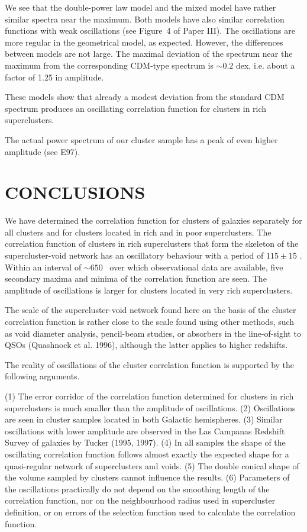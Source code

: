 We see that the double-power law model and the mixed model have rather
similar spectra near the maximum. Both models have also similar
correlation functions with weak oscillations (see Figure~4 of Paper
III).  The oscillations are more regular in the geometrical model, as
expected. However, the differences between models are not large.  The
maximal deviation of the spectrum near the maximum from the
corresponding CDM-type spectrum is  $\sim 0.2$ dex,
i.e. about a factor of 1.25 in amplitude. 

These models show that already a modest deviation from the
standard CDM spectrum  produces an oscillating correlation
function for clusters in rich superclusters.

The actual power spectrum of our cluster sample has a peak of even
higher amplitude (see E97).



\section{  CONCLUSIONS}

We have determined the correlation function for clusters of galaxies
separately for all clusters and for clusters located in rich and in
poor superclusters. The correlation function of clusters in rich
superclusters that form the skeleton of the supercluster-void network
has an oscillatory behaviour with a period of $115
\pm 15$ \Mpc. Within an interval of $\sim650$ \Mpc\ over which 
observational data are available, five secondary maxima and minima of
the correlation function are seen.  The amplitude of oscillations is
larger for clusters located in very rich superclusters.

The scale of the supercluster-void network found here on the basis of the
cluster correlation function is rather close to the scale found using other
methods, such as void diameter analysis, pencil-beam studies, or absorbers in
the line-of-sight to QSOs (Quashnock et al. 1996), although the latter applies
to higher redshifts.

The reality of oscillations of the cluster correlation function
is supported by the following arguments.

(1) The error corridor of the correlation function determined for clusters
in rich superclusters is much smaller
than the amplitude of oscillations.
(2) Oscillations are seen in cluster samples located
in both Galactic hemispheres.  
(3) Similar oscillations with lower amplitude are observed in the
Las Campanas Redshift Survey of galaxies by Tucker \etal (1995, 1997).
(4) In all samples the shape of the oscillating
correlation function  follows almost exactly the expected shape
 for a quasi-regular network of superclusters and voids.
(5) The double conical shape of the volume sampled by 
clusters cannot influence the results. 
(6) Parameters of the oscillations practically do not depend
on the smoothing length of the correlation function, nor on the
neighbourhood radius used in supercluster definition, or on errors of
the selection function used to calculate the correlation function.

